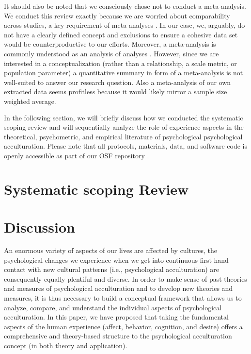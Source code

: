 \documentclass[man, 12pt, a4paper, mask]{apa7}
\begin{document}
It should also be noted that we consciously chose not to conduct a meta-analysis. We conduct this review exactly because we are worried about comparability across studies, a key requirement of meta-analyses \citep{Pogue1998}. In our case, we, arguably, do not have a clearly defined concept and exclusions to ensure a cohesive data set would be counterproductive to our efforts. Moreover, a meta-analysis is commonly understood as an analysis of analyses \citep{Glass1976}. However, since we are interested in a conceptualization (rather than a relationship, a scale metric, or population parameter) a quantitative summary in form of a meta-analysis is not well-suited to answer our research question. Also a meta-analysis of our own extracted data seems profitless because it would likely mirror a sample size weighted average.

In the following section, we will briefly discuss how we conducted the systematic scoping review and will sequentially analyze the role of experience aspects in the theoretical, psychometric, and empirical literature of psychological psychological acculturation. Please note that all protocols, materials, data, and software code is openly accessible as part of our OSF repository \citep[][]{Kreienkamp2021e}.


\section{Systematic scoping Review}


\section{Discussion}
An enormous variety of aspects of our lives are affected by cultures, the psychological changes we experience when we get into continuous first-hand contact with new cultural patterns (i.e., psychological acculturation) are consequently equally plentiful and diverse.
In order to make sense of past theories and measures of psychological acculturation and to develop new theories and measures, it is thus necessary to build a conceptual framework that allows us to analyze, compare, and understand the individual aspects of psychological acculturation.
In this paper, we have proposed that taking the fundamental aspects of the human experience (affect, behavior, cognition, and desire) offers a comprehensive and theory-based structure to the psychological acculturation concept (in both theory and application). 
\end{document}
